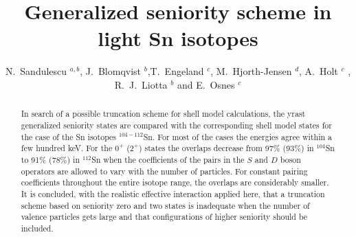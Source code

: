
\title{Generalized seniority scheme in light Sn isotopes }


\author {N.\ Sandulescu $^{a,b}$, J.\ Blomqvist $^b$,T.\ Engeland $^c$, 
	M.\ Hjorth-Jensen $^d$, A.\ Holt $^c$ , R.\ J.\ Liotta $^b$ and 
        E.\ Osnes $^c$ }


\address{$^a$Institute of Atomic Physics, P.O.Box MG-6, Bucharest, Romania}

\address{$^b$Royal Institute of Technology, Physics Department
Frescati, S-10405, Stockholm,Sweden}

\address{$^c$Department of Physics, 
University of Oslo, N-0316 Oslo, Norway}

\address{$^d$Nordita, Blegdamsvej 17, DK-2100 K\o benhavn \O, Denmark}

\maketitle



\begin{abstract}
In search of a possible truncation scheme for shell model calculations,
the  yrast generalized seniority  states  are compared with  the   
corresponding  shell model  states for the case of the Sn
isotopes $^{104-112}$Sn. For most of the cases the energies 
agree within a few hundred keV. For the $0^+$ ($2^+$) states the 
overlaps decrease from 97\% (93\%) in $^{104}$Sn to 91\% (78\%) 
in $^{112}$Sn when the coefficients of the pairs in the $S$ and $D$
boson operators are allowed to vary with the number of particles. 
For constant
pairing coefficients throughout the entire isotope range, the overlaps
are considerably smaller. It is concluded, with the
realistic effective interaction applied here, that a truncation scheme
based on seniority zero and two states is inadequate when the 
number of valence particles gets large and 
that configurations of higher seniority
should be included.

\end{abstract}


